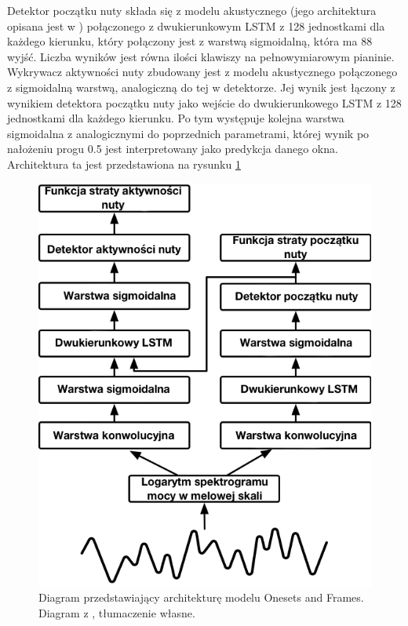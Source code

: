 \documentclass[12pt,a4paper,twoside]{mwart}
\begin{document}
Detektor początku nuty składa się z modelu akustycznego (jego architektura opisana jest w \cite[1-3]{Transcription:Kelz:AcousticModel}) połączonego z dwukierunkowym LSTM z 128 jednostkami dla każdego kierunku, który połączony jest z warstwą sigmoidalną, która ma 88 wyjść. Liczba wyników jest równa ilości klawiszy na pełnowymiarowym pianinie. Wykrywacz aktywności nuty zbudowany jest z modelu akustycznego połączonego z sigmoidalną warstwą, analogiczną do tej w detektorze. Jej wynik jest łączony z wynikiem detektora początku nuty jako wejście do dwukierunkowego LSTM z 128 jednostkami dla każdego kierunku. Po tym występuje kolejna warstwa sigmoidalna z analogicznymi do poprzednich parametrami, której wynik po nałożeniu progu 0.5 jest interpretowany jako predykcja danego okna. Architektura ta jest przedstawiona na rysunku \ref{fig:onsetsAndFramesArch}
\begin{figure}[h]
  \begin{center}
    \includegraphics[scale=0.8]{images/architekturaSieciOnesetsFrames.png}
    \caption{Diagram przedstawiający architekturę modelu Onesets and Frames. Diagram z \cite{Transcription:OnsetsAndFrames:Blog}, tłumaczenie własne.}
    \label{fig:onsetsAndFramesArch}
  \end{center}
\end{figure}
\end{document}
